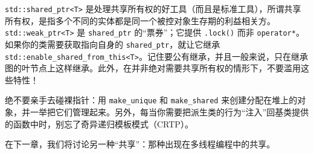 \texttt{std::\allowbreak{}shared\_\allowbreak{}ptr<\allowbreak{}T>\allowbreak{}} 是处理共享所有权的好工具（而且是标准工具），所谓共享所有权，是指多个不同的实体都是同一个被控对象生存期的利益相关方。\texttt{std::\allowbreak{}weak\_\allowbreak{}ptr<\allowbreak{}T>\allowbreak{}} 是 \texttt{shared\_\allowbreak{}ptr} 的“票券”；它提供 \texttt{.lock(\allowbreak{})\allowbreak{}} 而非 \texttt{operator*}。如果你的类需要获取指向自身的 \texttt{shared\_\allowbreak{}ptr}，就让它继承 \texttt{std::\allowbreak{}enable\_\allowbreak{}shared\_\allowbreak{}from\_\allowbreak{}this<\allowbreak{}T>\allowbreak{}}。记住要公有继承，并且一般来说，只在继承图的叶节点上这样继承。此外，在并非绝对需要共享所有权的情形下，不要滥用这些特性！

绝不要亲手去碰裸指针：用 \texttt{make\_\allowbreak{}unique} 和 \texttt{make\_\allowbreak{}shared} 来创建分配在堆上的对象，并一举把它们管理起来。另外，每当你需要把派生类的行为“注入”回基类提供的函数中时，别忘了奇异递归模板模式（CRTP）。

在下一章，我们将讨论另一种“共享”：那种出现在多线程编程中的共享。
